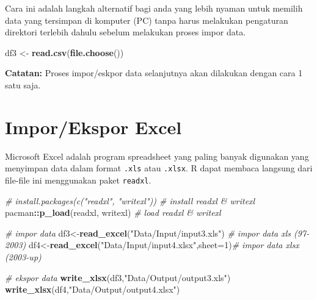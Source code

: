 \documentclass[
]{book}
\newenvironment{Shaded}{\begin{snugshade}}{\end{snugshade}}
\newcommand{\AttributeTok}[1]{\textcolor[rgb]{0.13,0.29,0.53}{#1}}
\newcommand{\CommentTok}[1]{\textcolor[rgb]{0.56,0.35,0.01}{\textit{#1}}}
\newcommand{\DecValTok}[1]{\textcolor[rgb]{0.00,0.00,0.81}{#1}}
\newcommand{\FunctionTok}[1]{\textcolor[rgb]{0.13,0.29,0.53}{\textbf{#1}}}
\newcommand{\NormalTok}[1]{#1}
\newcommand{\OtherTok}[1]{\textcolor[rgb]{0.56,0.35,0.01}{#1}}
\newcommand{\SpecialCharTok}[1]{\textcolor[rgb]{0.81,0.36,0.00}{\textbf{#1}}}
\newcommand{\StringTok}[1]{\textcolor[rgb]{0.31,0.60,0.02}{#1}}
\begin{document}
Cara ini adalah langkah alternatif bagi anda yang lebih nyaman untuk memilih data yang tersimpan di komputer (PC) tanpa harus melakukan pengaturan direktori terlebih dahulu sebelum melakukan proses impor data.

\begin{Shaded}
\begin{Highlighting}[]
\NormalTok{df3 }\OtherTok{\textless{}{-}} \FunctionTok{read.csv}\NormalTok{(}\FunctionTok{file.choose}\NormalTok{())}
\end{Highlighting}
\end{Shaded}

\textbf{Catatan:} Proses impor/eskpor data selanjutnya akan dilakukan dengan cara 1 satu saja.

\hypertarget{imporekspor-excel}{%
\section{Impor/Ekspor Excel}\label{imporekspor-excel}}

Microsoft Excel adalah program spreadsheet yang paling banyak digunakan yang menyimpan data dalam format \texttt{.xls} atau \texttt{.xlsx}. R dapat membaca langsung dari file-file ini menggunakan paket \texttt{readxl}.

\begin{Shaded}
\begin{Highlighting}[]
\CommentTok{\# install.packages(c("readxl", "writexl"))       \# install \textasciigrave{}readxl \& writexl\textasciigrave{} }
\NormalTok{pacman}\SpecialCharTok{::}\FunctionTok{p\_load}\NormalTok{(readxl, writexl)                  }\CommentTok{\# load \textasciigrave{}readxl \& writexl\textasciigrave{}}

\CommentTok{\# impor data}
\NormalTok{df3}\OtherTok{\textless{}{-}}\FunctionTok{read\_excel}\NormalTok{(}\StringTok{"Data/Input/input3.xls"}\NormalTok{)         }\CommentTok{\# impor data xls (97{-}2003)}
\NormalTok{df4}\OtherTok{\textless{}{-}}\FunctionTok{read\_excel}\NormalTok{(}\StringTok{"Data/Input/input4.xlsx"}\NormalTok{,}\AttributeTok{sheet=}\DecValTok{1}\NormalTok{)}\CommentTok{\# impor data xlsx (2003{-}up)}

\CommentTok{\# ekspor data}
\FunctionTok{write\_xlsx}\NormalTok{(df3,}\StringTok{"Data/Output/output3.xls"}\NormalTok{) }
\FunctionTok{write\_xlsx}\NormalTok{(df4,}\StringTok{"Data/Output/output4.xlsx"}\NormalTok{)}
\end{Highlighting}
\end{Shaded}
\end{document}
